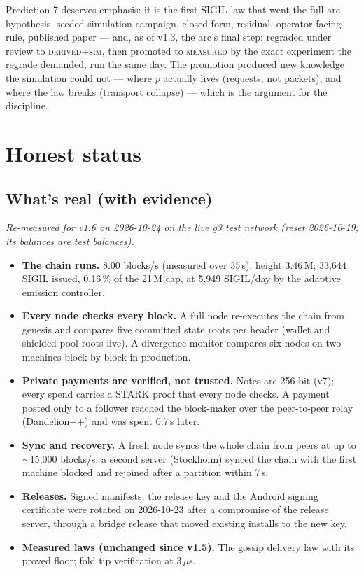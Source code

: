 \documentclass[10pt,a4paper]{article}
\begin{document}
Prediction 7 deserves emphasis: it is the first SIGIL law that went the full arc —
hypothesis, seeded simulation campaign, closed form, residual, operator-facing rule,
published paper — and, as of v1.3, the arc's final step: regraded under review to
\textsc{derived+sim}, then promoted to \textsc{measured} by the exact experiment the
regrade demanded, run the same day. The promotion produced new knowledge the
simulation could not — where $p$ actually lives (requests, not packets), and where
the law breaks (transport collapse) — which is the argument for the discipline.

\section{Honest status}\label{sec:honesty}

\subsection{What's real (with evidence)}

\noindent\emph{Re-measured for v1.6 on 2026-10-24 on the live g3 test network (reset 2026-10-19; its balances are test
balances).}
\begin{itemize}
\item \textbf{The chain runs.} 8.00 blocks/s (measured over 35\,s); height 3.46\,M; 33{,}644 SIGIL issued, 0.16\,\%
of the 21\,M cap, at 5{,}949 SIGIL/day by the adaptive emission controller.
\item \textbf{Every node checks every block.} A full node re-executes the chain from genesis and compares five
committed state roots per header (wallet and shielded-pool roots live). A divergence monitor compares six nodes on two
machines block by block in production.
\item \textbf{Private payments are verified, not trusted.} Notes are 256-bit (v7); every spend carries a STARK proof
that every node checks. A payment posted only to a follower reached the block-maker over the peer-to-peer relay
(Dandelion++) and was spent 0.7\,s later.
\item \textbf{Sync and recovery.} A fresh node syncs the whole chain from peers at up to $\sim$15{,}000 blocks/s; a
second server (Stockholm) synced the chain with the first machine blocked and rejoined after a partition within 7\,s.
\item \textbf{Releases.} Signed manifests; the release key and the Android signing certificate were rotated on
2026-10-23 after a compromise of the release server, through a bridge release that moved existing installs to the new key.
\item \textbf{Measured laws (unchanged since v1.5).} The gossip delivery law with its proved floor; fold tip
verification at 3\,$\mu$s.
\end{itemize}
\end{document}
